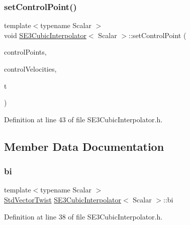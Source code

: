 \subsubsection{\texorpdfstring{set\+Control\+Point()}{setControlPoint()}}
{\footnotesize\ttfamily template$<$typename Scalar $>$ \\
void \hyperlink{class_s_e3_cubic_interpolator}{S\+E3\+Cubic\+Interpolator}$<$ Scalar $>$\+::set\+Control\+Point (\begin{DoxyParamCaption}\item[{const \hyperlink{class_s_e3_cubic_interpolator_ad6c935ddaa217d370411c200321dc089}{Std\+Vector\+Displacement} \&}]{control\+Points,  }\item[{const \hyperlink{class_s_e3_cubic_interpolator_ae70acde9b57ec38aaf1eaeee50bb35c5}{Std\+Vector\+Twist} \&}]{control\+Velocities,  }\item[{const std\+::vector$<$ Scalar $>$ \&}]{t }\end{DoxyParamCaption})}



Definition at line 43 of file S\+E3\+Cubic\+Interpolator.\+h.



\subsection{Member Data Documentation}
\hypertarget{class_s_e3_cubic_interpolator_ad54c52fb731ed48fcebab82d2d6c1c57}{}\label{class_s_e3_cubic_interpolator_ad54c52fb731ed48fcebab82d2d6c1c57} 
\subsubsection{\texorpdfstring{bi}{bi}}
{\footnotesize\ttfamily template$<$typename Scalar $>$ \\
\hyperlink{class_s_e3_cubic_interpolator_ae70acde9b57ec38aaf1eaeee50bb35c5}{Std\+Vector\+Twist} \hyperlink{class_s_e3_cubic_interpolator}{S\+E3\+Cubic\+Interpolator}$<$ Scalar $>$\+::bi\hspace{0.3cm}{\ttfamily [protected]}}



Definition at line 38 of file S\+E3\+Cubic\+Interpolator.\+h.

\hypertarget{class_s_e3_cubic_interpolator_a45865a05f0ce3a10cfc69b992bee971e}{}\label{class_s_e3_cubic_interpolator_a45865a05f0ce3a10cfc69b992bee971e} 
